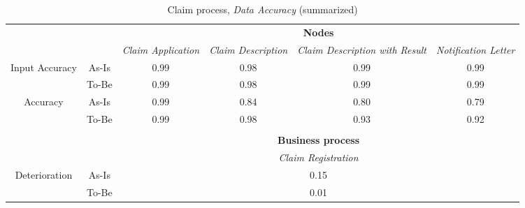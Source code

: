\begin{center}
\begin{table}[H]
\begin{tabular}{|c|c|p{2cm}|p{2.5cm}|p{2.5cm}|p{2.5cm}|}


\cline{3-6}
\multicolumn{2}{c}{} & \multicolumn{4}{|c|}{\textbf{Nodes}} \\ \cline{3-6}
\multicolumn{2}{c|}{} & \textsl{Claim Application} & \textsl{Claim Description} & \textsl{Claim Description with Result} & \textsl{Notification Letter}\\
\hline
\multirow{2}{*}{Input Accuracy} & As-Is & \multicolumn{1}{c|}{0.99} & \multicolumn{1}{c|}{0.98} & \multicolumn{1}{c|}{0.99} & \multicolumn{1}{c|}{0.99}\\ \cline{2-6}
								& To-Be & \multicolumn{1}{c|}{0.99} & \multicolumn{1}{c|}{0.98} & \multicolumn{1}{c|}{0.99} & \multicolumn{1}{c|}{0.99}\\ \hline

\multirow{2}{*}{Accuracy} 		& As-Is & \multicolumn{1}{c|}{0.99} & \multicolumn{1}{c|}{0.84} & \multicolumn{1}{c|}{0.80} & \multicolumn{1}{c|}{0.79}\\ \cline{2-6}
								& To-Be & \multicolumn{1}{c|}{0.99} & \multicolumn{1}{c|}{0.98} & \multicolumn{1}{c|}{0.93} & \multicolumn{1}{c|}{0.92}\\ \hline

\multicolumn{6}{c}{} \\ \cline{3-6}
\multicolumn{2}{c}{} & \multicolumn{4}{|c|}{\textbf{Business process}} \\ \cline{3-6}
\multicolumn{2}{c|}{} & \multicolumn{4}{|c|}{\textsl{Claim Registration}} \\ \hline
\multirow{2}{*}{Deterioration} & As-Is & \multicolumn{4}{|c|}{0.15}\\ \cline{2-6}
							   & To-Be & \multicolumn{4}{|c|}{0.01}\\ \hline
\end{tabular}
\caption{Claim process, \textsl{Data Accuracy} (summarized)}
\label{tab:claim_both}
\end{table}
\end{center}
